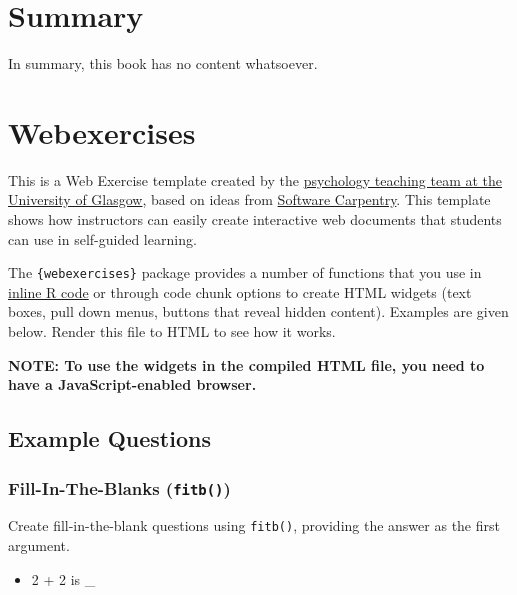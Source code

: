 \documentclass[
  letterpaper,
  DIV=11,
  numbers=noendperiod]{scrreprt}
\providecommand{\tightlist}{%
  \setlength{\itemsep}{0pt}\setlength{\parskip}{0pt}}\usepackage{longtable,booktabs,array}
\begin{document}

\chapter{Summary}\label{summary}

In summary, this book has no content whatsoever.


\chapter{Webexercises}\label{webexercises}

This is a Web Exercise template created by the
\href{http://www.psy.gla.ac.uk}{psychology teaching team at the
University of Glasgow}, based on ideas from
\href{https://software-carpentry.org/lessons/}{Software Carpentry}. This
template shows how instructors can easily create interactive web
documents that students can use in self-guided learning.

The \texttt{\{webexercises\}} package provides a number of functions
that you use in
\href{https://github.com/rstudio/cheatsheets/raw/master/rmarkdown-2.0.pdf}{inline
R code} or through code chunk options to create HTML widgets (text
boxes, pull down menus, buttons that reveal hidden content). Examples
are given below. Render this file to HTML to see how it works.

\textbf{NOTE: To use the widgets in the compiled HTML file, you need to
have a JavaScript-enabled browser.}

\section{Example Questions}\label{example-questions}

\subsection{\texorpdfstring{Fill-In-The-Blanks
(\texttt{fitb()})}{Fill-In-The-Blanks (fitb())}}\label{fill-in-the-blanks-fitb}

Create fill-in-the-blank questions using \texttt{fitb()}, providing the
answer as the first argument.

\begin{itemize}
\tightlist
\item
  2 + 2 is \_
\end{itemize}
\end{document}
